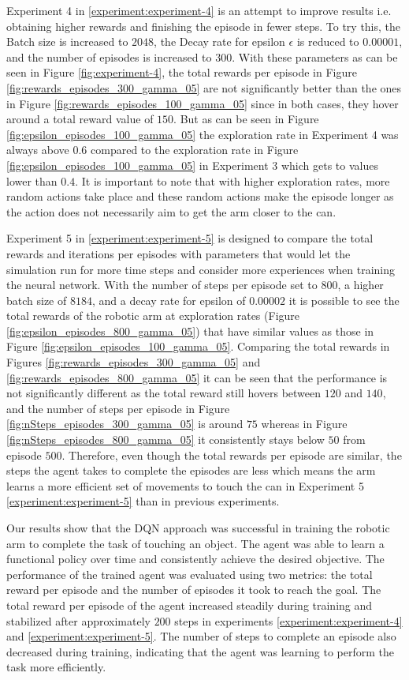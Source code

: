 \documentclass[12pt,oneside]{article}
\begin{document}
Experiment 4 in \ref{experiment:experiment-4} is an attempt to improve results i.e. obtaining higher rewards and finishing the episode in fewer steps. To try this, the Batch size is increased to $2048$, the Decay rate for epsilon $\epsilon$ is reduced to $0.00001$, and the number of episodes is increased to $300$. With these parameters as can be seen in Figure \ref{fig:experiment-4}, the total rewards per episode in Figure \ref{fig:rewards_episodes_300_gamma_05} are not significantly better than the ones in Figure \ref{fig:rewards_episodes_100_gamma_05} since in both cases, they hover around a total reward value of $150$. But as can be seen in Figure \ref{fig:epsilon_episodes_100_gamma_05} the exploration rate in Experiment 4 was always above $0.6$ compared to the exploration rate in Figure \ref{fig:epsilon_episodes_100_gamma_05} in Experiment 3 which gets to values lower than $0.4$. It is important to note that with higher exploration rates, more random actions take place and these random actions make the episode longer as the action does not necessarily aim to get the arm closer to the can. 

Experiment 5 in \ref{experiment:experiment-5} is designed to compare the total rewards and iterations per episodes with parameters that would let the simulation run for more time steps and consider more experiences when training the neural network. With the number of steps per episode set to $800$, a higher batch size of $8184$, and a decay rate for epsilon of $0.00002$ it is possible to see the total rewards of the robotic arm at exploration rates (Figure \ref{fig:epsilon_episodes_800_gamma_05}) that have similar values as those in Figure \ref{fig:epsilon_episodes_100_gamma_05}. Comparing the total rewards in Figures \ref{fig:rewards_episodes_300_gamma_05} and \ref{fig:rewards_episodes_800_gamma_05} it can be seen that the performance is not significantly different as the total reward still hovers between $120$ and $140$, and the number of steps per episode in Figure \ref{fig:nSteps_episodes_300_gamma_05} is around $75$ whereas in Figure \ref{fig:nSteps_episodes_800_gamma_05} it consistently stays below $50$ from episode $500$. Therefore, even though the total rewards per episode are similar, the steps the agent takes to complete the episodes are less which means the arm learns a more efficient set of movements to touch the can in Experiment 5 \ref{experiment:experiment-5} than in previous experiments.

Our results show that the DQN approach was successful in training the robotic arm to complete the task of touching an object. The agent was able to learn a functional policy over time and consistently achieve the desired objective. The performance of the trained agent was evaluated using two metrics: the total reward per episode and the number of episodes it took to reach the goal. The total reward per episode of the agent increased steadily during training and stabilized after approximately $200$ steps in experiments \ref{experiment:experiment-4} and \ref{experiment:experiment-5}. The number of steps to complete an episode also decreased during training, indicating that the agent was learning to perform the task more efficiently.
\end{document}
